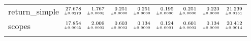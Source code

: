 \documentclass[a4paper,UKenglish]{lipics-v2016}
\begin{document}
\begin{table*}
\begin{adjustbox}{width=1.2\textwidth,center}
\begin{tabular}{lrrrrrrrr}
\addlinespace
return\_simple&$\substack{\mathmakebox[.7cm][r]{27.678}\\{\mathmakebox[.7cm][r]{\scriptscriptstyle \pm 0.0273}}}$&$\substack{\mathmakebox[.7cm][r]{1.767}\\{\mathmakebox[.7cm][r]{\scriptscriptstyle \pm 0.0005}}}$&$\substack{\mathmakebox[.7cm][r]{0.251}\\{\mathmakebox[.7cm][r]{\scriptscriptstyle \pm 0.0000}}}$&$\substack{\mathmakebox[.7cm][r]{0.251}\\{\mathmakebox[.7cm][r]{\scriptscriptstyle \pm 0.0000}}}$&$\substack{\mathmakebox[.7cm][r]{0.195}\\{\mathmakebox[.7cm][r]{\scriptscriptstyle \pm 0.0000}}}$&$\substack{\mathmakebox[.7cm][r]{0.251}\\{\mathmakebox[.7cm][r]{\scriptscriptstyle \pm 0.0000}}}$&$\substack{\mathmakebox[.7cm][r]{0.223}\\{\mathmakebox[.7cm][r]{\scriptscriptstyle \pm 0.0000}}}$&$\substack{\mathmakebox[.7cm][r]{21.239}\\{\mathmakebox[.7cm][r]{\scriptscriptstyle \pm 0.0161}}}$\\
\addlinespace
scopes&$\substack{\mathmakebox[.7cm][r]{17.854}\\{\mathmakebox[.7cm][r]{\scriptscriptstyle \pm 0.0065}}}$&$\substack{\mathmakebox[.7cm][r]{2.009}\\{\mathmakebox[.7cm][r]{\scriptscriptstyle \pm 0.0002}}}$&$\substack{\mathmakebox[.7cm][r]{0.603}\\{\mathmakebox[.7cm][r]{\scriptscriptstyle \pm 0.0003}}}$&$\substack{\mathmakebox[.7cm][r]{0.134}\\{\mathmakebox[.7cm][r]{\scriptscriptstyle \pm 0.0000}}}$&$\substack{\mathmakebox[.7cm][r]{0.124}\\{\mathmakebox[.7cm][r]{\scriptscriptstyle \pm 0.0001}}}$&$\substack{\mathmakebox[.7cm][r]{0.601}\\{\mathmakebox[.7cm][r]{\scriptscriptstyle \pm 0.0002}}}$&$\substack{\mathmakebox[.7cm][r]{0.134}\\{\mathmakebox[.7cm][r]{\scriptscriptstyle \pm 0.0000}}}$&$\substack{\mathmakebox[.7cm][r]{20.412}\\{\mathmakebox[.7cm][r]{\scriptscriptstyle \pm 0.0014}}}$\\
\addlinespace

\end{tabular}
\end{adjustbox}
\end{table*}
\end{document}
